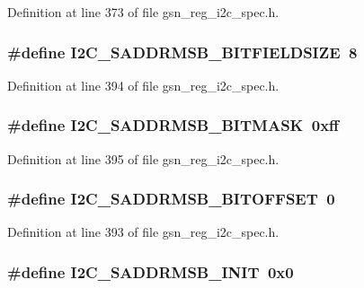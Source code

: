 Definition at line 373 of file gsn\_\-reg\_\-i2c\_\-spec.h.

\hypertarget{a00558_a37670e88f72b7a2adc059f464ce1daca}{
\subsubsection[{I2C\_\-SADDRMSB\_\-BITFIELDSIZE}]{\setlength{\rightskip}{0pt plus 5cm}\#define I2C\_\-SADDRMSB\_\-BITFIELDSIZE~8}}
\label{a00558_a37670e88f72b7a2adc059f464ce1daca}


Definition at line 394 of file gsn\_\-reg\_\-i2c\_\-spec.h.

\hypertarget{a00558_a7ac576e2bbf84d1555618cca46619b0d}{
\subsubsection[{I2C\_\-SADDRMSB\_\-BITMASK}]{\setlength{\rightskip}{0pt plus 5cm}\#define I2C\_\-SADDRMSB\_\-BITMASK~0xff}}
\label{a00558_a7ac576e2bbf84d1555618cca46619b0d}


Definition at line 395 of file gsn\_\-reg\_\-i2c\_\-spec.h.

\hypertarget{a00558_ad2b146b17cc4beb07a3abeb973e2ba82}{
\subsubsection[{I2C\_\-SADDRMSB\_\-BITOFFSET}]{\setlength{\rightskip}{0pt plus 5cm}\#define I2C\_\-SADDRMSB\_\-BITOFFSET~0}}
\label{a00558_ad2b146b17cc4beb07a3abeb973e2ba82}


Definition at line 393 of file gsn\_\-reg\_\-i2c\_\-spec.h.

\hypertarget{a00558_a33ca88d59412594c6c915e0a58e7c358}{
\subsubsection[{I2C\_\-SADDRMSB\_\-INIT}]{\setlength{\rightskip}{0pt plus 5cm}\#define I2C\_\-SADDRMSB\_\-INIT~0x0}}
\label{a00558_a33ca88d59412594c6c915e0a58e7c358}


